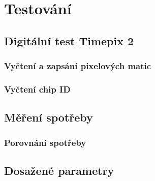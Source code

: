 \chapter{Testování}
\section{Digitální test Timepix 2} %
	\subsection{Vyčtení a zapsání pixelových matic}
	\subsection{Vyčtení chip ID}
\section{Měření spotřeby}
	\subsection{Porovnání spotřeby}
\section{Dosažené parametry}